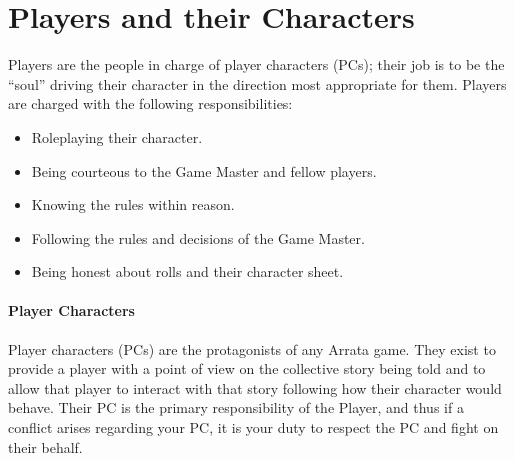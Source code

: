\documentclass[../main.tex]{subfiles}
\begin{document}
    \section{Players and their Characters}

    Players are the people in charge of player characters (PCs); their job is to be the ``soul'' driving their character in the direction most appropriate for them. Players are charged with the following responsibilities:

    \begin{itemize}
        \item Roleplaying their character.
        \item Being courteous to the Game Master and fellow players.
        \item Knowing the rules within reason.
        \item Following the rules and decisions of the Game Master.
        \item Being honest about rolls and their character sheet.
    \end{itemize}

    \paragraph{Player Characters}

    Player characters (PCs) are the protagonists of any Arrata game. They exist to provide a player with a point of view on the collective story being told and to allow that player to interact with that story following how their character would behave. Their PC is the primary responsibility of the Player, and thus if a conflict arises regarding your PC, it is your duty to respect the PC and fight on their behalf.
\end{document}
